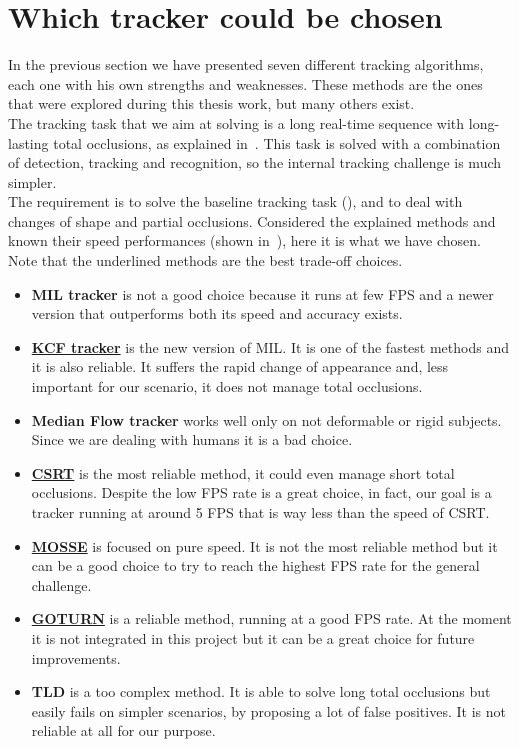 \section{Which tracker could be chosen}
In the previous section we have presented seven different tracking algorithms, each one with his own strengths and weaknesses. These methods are the ones that were explored during this thesis work, but many others exist.\\
The tracking task that we aim at solving is a long real-time sequence with long-lasting total occlusions, as explained in~. This task is solved with a combination of detection, tracking and recognition, so the internal tracking challenge is much simpler.\\
The requirement is to solve the baseline tracking task (), and to deal with changes of shape and partial occlusions. Considered the explained methods and known their speed performances (shown in~), here it is what we have chosen. Note that the underlined methods are the best trade-off choices. 
\begin{itemize}
	\item \textbf{MIL tracker} is not a good choice because it runs at few FPS and a newer version that outperforms both its speed and accuracy exists.
	\item \underline{\textbf{KCF tracker}} is the new version of MIL. It is one of the fastest methods and it is also reliable. It suffers the rapid change of appearance and, less important for our scenario, it does not manage total occlusions.
	\item \textbf{Median Flow tracker} works well only on not deformable or rigid subjects. Since we are dealing with humans it is a bad choice.
	\item \underline{\textbf{CSRT}} is the most reliable method, it could even manage short total occlusions. Despite the low FPS rate is a great choice, in fact, our goal is a tracker running at around 5 FPS that is way less than the speed of CSRT.
	\item \underline{\textbf{MOSSE}} is focused on pure speed. It is not the most reliable method but it can be a good choice to try to reach the highest FPS rate for the general challenge.
	\item \underline{\textbf{GOTURN}} is a reliable method, running at a good FPS rate. At the moment it is not integrated in this project but it can be a great choice for future improvements.
	\item \textbf{TLD} is a too complex method. It is able to solve long total occlusions but easily fails on simpler scenarios, by proposing a lot of false positives. It is not reliable at all for our purpose.
\end{itemize}

